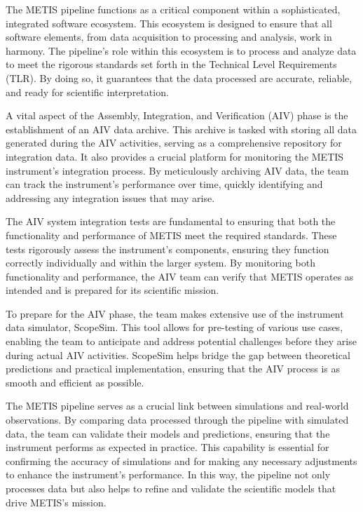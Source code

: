 \documentclass[a4paper]{spie}  %
\begin{document}
The METIS pipeline functions as a critical component within a sophisticated, integrated software ecosystem. This ecosystem is designed to ensure that all software elements, from data acquisition to processing and analysis, work in harmony. The pipeline's role within this ecosystem is to process and analyze data to meet the rigorous standards set forth in the Technical Level Requirements (TLR). By doing so, it guarantees that the data processed are accurate, reliable, and ready for scientific interpretation.

A vital aspect of the Assembly, Integration, and Verification (AIV) phase is the establishment of an AIV data archive. This archive is tasked with storing all data generated during the AIV activities, serving as a comprehensive repository for integration data. It also provides a crucial platform for monitoring the METIS instrument's integration process. By meticulously archiving AIV data, the team can track the instrument's performance over time, quickly identifying and addressing any integration issues that may arise.

The AIV system integration tests are fundamental to ensuring that both the functionality and performance of METIS meet the required standards. These tests rigorously assess the instrument's components, ensuring they function correctly individually and within the larger system. By monitoring both functionality and performance, the AIV team can verify that METIS operates as intended and is prepared for its scientific mission.

To prepare for the AIV phase, the team makes extensive use of the instrument data simulator, ScopeSim. This tool allows for pre-testing of various use cases, enabling the team to anticipate and address potential challenges before they arise during actual AIV activities. ScopeSim helps bridge the gap between theoretical predictions and practical implementation, ensuring that the AIV process is as smooth and efficient as possible.

The METIS pipeline serves as a crucial link between simulations and real-world observations. By comparing data processed through the pipeline with simulated data, the team can validate their models and predictions, ensuring that the instrument performs as expected in practice. This capability is essential for confirming the accuracy of simulations and for making any necessary adjustments to enhance the instrument's performance. In this way, the pipeline not only processes data but also helps to refine and validate the scientific models that drive METIS's mission.
\end{document}
